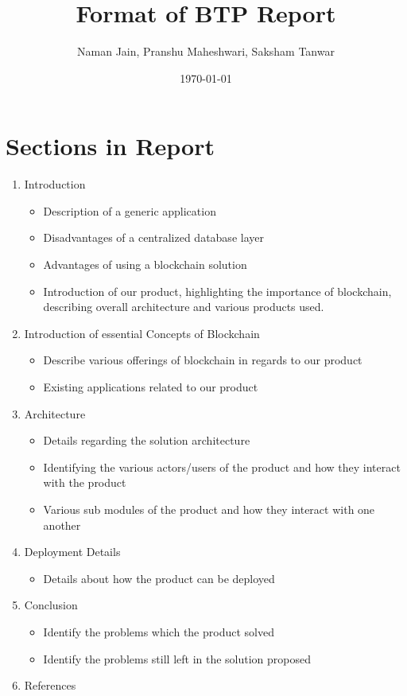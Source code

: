 \documentclass{article}
\title{Format of BTP Report}
\author{Naman Jain, Pranshu Maheshwari, Saksham Tanwar}
\date{\today}
\begin{document}
\maketitle

\section*{Sections in Report}
\begin{enumerate}
    \item Introduction
    \begin{itemize}
        \item Description of a generic application
        \item Disadvantages of a centralized database layer
        \item Advantages of using a blockchain solution
        \item Introduction of our product, highlighting the importance of blockchain, describing overall architecture and various products used.
    \end{itemize}
    \item Introduction of essential Concepts of Blockchain
    \begin{itemize}
        \item Describe various offerings of blockchain in regards to our product
        \item Existing applications related to our product
    \end{itemize}
    \item Architecture
    \begin{itemize}
        \item Details regarding the solution architecture
        \item Identifying the various actors/users of the product and how they interact with the product
        \item Various sub modules of the product and how they interact with one another
    \end{itemize}
    \item Deployment Details
    \begin{itemize}
        \item Details about how the product can be deployed
    \end{itemize}
    \item Conclusion
    \begin{itemize}
        \item Identify the problems which the product solved
        \item Identify the problems still left in the solution proposed
    \end{itemize}
    \item References

\end{enumerate}
\end{document}
